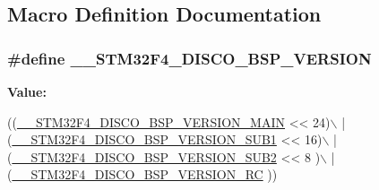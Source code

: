 \subsection{Macro Definition Documentation}
\hypertarget{group__STM32F4__DISCOVERY__LOW__LEVEL__Private__Defines_ga1101b34f52c69caee56e6a2907352441}{
\subsubsection[{\-\_\-\-\_\-\-S\-T\-M32\-F4\-\_\-\-D\-I\-S\-C\-O\-\_\-\-B\-S\-P\-\_\-\-V\-E\-R\-S\-I\-O\-N}]{\setlength{\rightskip}{0pt plus 5cm}\#define \-\_\-\-\_\-\-S\-T\-M32\-F4\-\_\-\-D\-I\-S\-C\-O\-\_\-\-B\-S\-P\-\_\-\-V\-E\-R\-S\-I\-O\-N}}\label{group__STM32F4__DISCOVERY__LOW__LEVEL__Private__Defines_ga1101b34f52c69caee56e6a2907352441}
{\bfseries Value\-:}
\begin{DoxyCode}
((\hyperlink{group__STM32F4__DISCOVERY__LOW__LEVEL__Private__Defines_ga9b9ce78017b00a5149e65e663676bf1a}{\_\_STM32F4\_DISCO\_BSP\_VERSION\_MAIN} << 24)\(\backslash\)
                                             |(\hyperlink{group__STM32F4__DISCOVERY__LOW__LEVEL__Private__Defines_ga53a734726d1b7247bb620a56de8d154e}{\_\_STM32F4\_DISCO\_BSP\_VERSION\_SUB1}
       << 16)\(\backslash\)
                                             |(\hyperlink{group__STM32F4__DISCOVERY__LOW__LEVEL__Private__Defines_ga56f24ebf9cca2d997596f4eb6aba19fc}{\_\_STM32F4\_DISCO\_BSP\_VERSION\_SUB2}
       << 8 )\(\backslash\)
                                             |(\hyperlink{group__STM32F4__DISCOVERY__LOW__LEVEL__Private__Defines_ga49aad18854e17cbfa696c09b9c02913c}{\_\_STM32F4\_DISCO\_BSP\_VERSION\_RC}
      ))
\end{DoxyCode}
